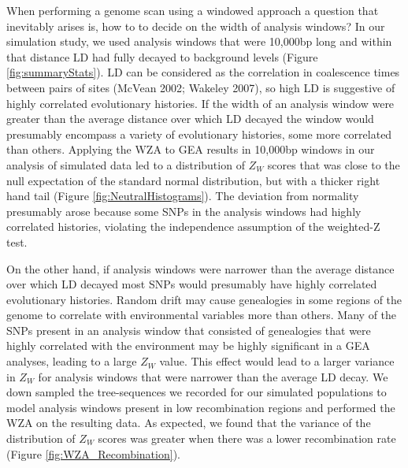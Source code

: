 \documentclass[10pt,twoside,lineno]{GSA_format}
\begin{document}
When performing a genome scan using a windowed approach a question that inevitably arises is, how to to decide on the width of analysis windows? In our simulation study, we used analysis windows that were 10,000bp long and within that distance LD had fully decayed to background levels (Figure \ref{fig:summaryStats}). LD can be considered as the correlation in coalescence times between pairs of sites (McVean 2002; Wakeley 2007), so high LD is suggestive of highly correlated evolutionary histories. If the width of an analysis window were greater than the average distance over which LD decayed the window would presumably encompass a variety of evolutionary histories, some more correlated than others. Applying the WZA to GEA results in 10,000bp windows in our analysis of simulated data led to a distribution of $Z_W$ scores that was close to the null expectation of the standard normal distribution, but with a thicker right hand tail (Figure \ref{fig:NeutralHistograms}). The deviation from normality presumably arose because some SNPs in the analysis windows had highly correlated histories, violating the independence assumption of the weighted-Z test. 

On the other hand, if analysis windows were narrower than the average distance over which LD decayed most SNPs would presumably have highly correlated evolutionary histories. Random drift may cause genealogies in some regions of the genome to correlate with environmental variables more than others. Many of the SNPs present in an analysis window that consisted of genealogies that were highly correlated with the environment may be highly significant in a GEA analyses, leading to a large $Z_W$ value. This effect would lead to a larger variance in $Z_W$ for analysis windows that were narrower than the average LD decay. We down sampled the tree-sequences we recorded for our simulated populations to model analysis windows present in low recombination regions and performed the WZA on the resulting data. As expected, we found that the variance of the distribution of $Z_W$ scores was greater when there was a lower recombination rate (Figure \ref{fig:WZA_Recombination}). \\
\end{document}
